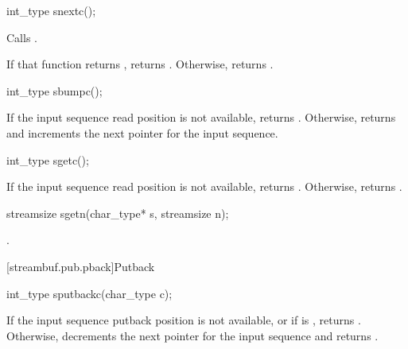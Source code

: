 %
\begin{itemdecl}
int_type snextc();
\end{itemdecl}

\begin{itemdescr}
\pnum
\effects
Calls
.

\pnum
\returns
If that function returns
,
returns
.
Otherwise, returns
.
\end{itemdescr}

%
\begin{itemdecl}
int_type sbumpc();
\end{itemdecl}

\begin{itemdescr}
\pnum
\returns
If the input sequence read position is not available,
returns
.
Otherwise, returns
and increments the next pointer for the input sequence.
\end{itemdescr}

%
\begin{itemdecl}
int_type sgetc();
\end{itemdecl}

\begin{itemdescr}
\pnum
\returns
If the input sequence read position is not available,
returns
.
Otherwise, returns
.
\end{itemdescr}

%
\begin{itemdecl}
streamsize sgetn(char_type* s, streamsize n);
\end{itemdecl}

\begin{itemdescr}
\pnum
\returns
{}.
\end{itemdescr}

[streambuf.pub.pback]{Putback}

%
\begin{itemdecl}
int_type sputbackc(char_type c);
\end{itemdecl}

\begin{itemdescr}
\pnum
\returns
If the input sequence putback position is not available, or
if
is , returns
.
Otherwise, decrements the next pointer for the input sequence and
returns
.
\end{itemdescr}

